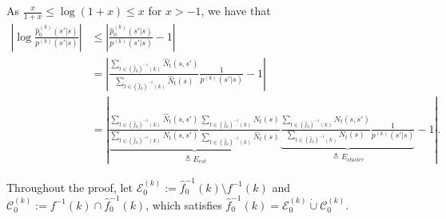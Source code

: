 \documentclass[twoside]{article}
\def\gC{{\mathcal{C}}}
\def\gE{{\mathcal{E}}}
\theoremstyle{plain}
\begin{document}
As $\frac{x}{1 + x} \leq \log(1 + x) \leq x$ for $x > -1$, we have that
\begin{align*}
    \left| \log\frac{\widehat{p}_0^{(k)}(s' | s)}{p^{(k)}(s' | s)} \right| &\leq \left| \frac{\widehat{p}_0^{(k)}(s' | s)}{p^{(k)}(s' | s)} - 1 \right| \\
    &= \left| \frac{\sum_{t \in (\widehat{f}_0)^{-1}(k)} \widehat{N}_t(s, s')}{\sum_{t \in (\widehat{f}_0)^{-1}(k)} \widehat{N}_t(s)} \frac{1}{p^{(k)}(s' | s)} - 1 \right| \\
    &= \left| \underbrace{
    \frac{\sum_{t \in (\widehat{f}_0)^{-1}(k)} \widehat{N}_t(s, s')}{\sum_{t \in (\widehat{f}_0)^{-1}(k)} N_t(s, s')}
    \frac{\sum_{t \in (\widehat{f}_0)^{-1}(k)} N_t(s)}{\sum_{t \in (\widehat{f}_0)^{-1}(k)} \widehat{N}_t(s)}
    }_{\triangleq E_{est}}
   \underbrace{
   \frac{\sum_{t \in (\widehat{f}_0)^{-1}(k)} N_t(s, s')}{\sum_{t \in (\widehat{f}_0)^{-1}(k)} N_t(s)}
   \frac{1}{p^{(k)}(s' | s)}
   }_{\triangleq E_{cluster}} - 1 \right|.
\end{align*}

Throughout the proof, let $\gE_0^{(k)} := \widehat{f}_0^{-1}(k) \setminus f^{-1}(k)$ and $\gC_0^{(k)} := f^{-1}(k) \cap \widehat{f}_0^{-1}(k)$, which satisfies $\widehat{f}_0^{-1}(k) = \gE_0^{(k)} \dot{\cup} \gC_0^{(k)}$.
\end{document}
